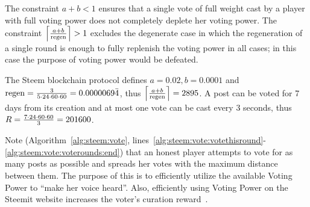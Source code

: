 \begin{remark}
  The constraint $a + b < 1$ ensures that a single vote of full weight cast by a
  player with full voting power does not completely deplete her voting power.
  The constraint $\ceil*{\frac{a + b}{\regen}} > 1$ excludes the degenerate
  case in which the regeneration of a single round is enough to fully replenish
  the voting power in all cases; in this case the purpose of voting power would
  be defeated.
\end{remark}

\begin{remark}
  The Steem blockchain protocol defines $a = 0.02, b = 0.0001$ and $\regen =
  \frac{3}{5 \cdot 24 \cdot 60 \cdot 60} = 0.0000069\bar{4}$, thus
  $\ceil*{\frac{a + b}{\regen}} = 2895$. A post can be voted for 7 days from its
  creation and at most one vote can be cast every 3 seconds, thus $\rounds =
  \frac{7 \cdot 24 \cdot 60 \cdot 60}{3} = 201600$.
\end{remark}

\begin{remark}
  Note (Algorithm~\ref{alg:steem:vote},
  lines~\ref{alg:steem:vote:votethisround}-\ref{alg:steem:vote:voterounds:end})
  that an honest player attempts to vote for as many posts as possible and
  spreads her votes with the maximum distance between them. The purpose of this
  is to efficiently utilize the available Voting Power to ``make her voice
  heard''. Also, efficiently using Voting Power on the Steemit website increases
  the voter's curation reward~\cite{curationRewards}.
\end{remark}
